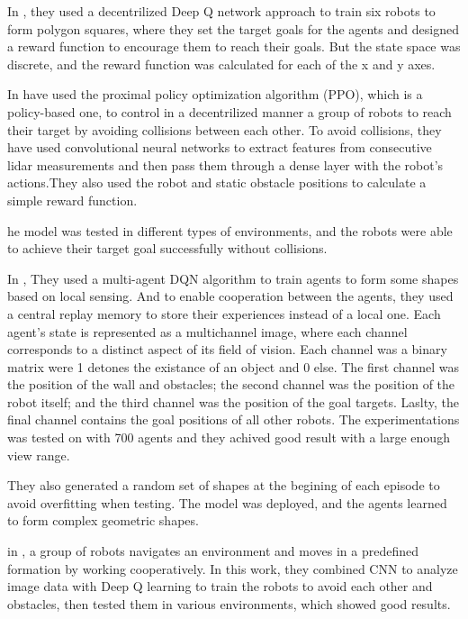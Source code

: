 \documentclass[12pt]{extarticle}
\begin{document}
In \cite{prasad2017multi}, they used a decentrilized Deep Q network approach to train six robots to form polygon squares, where they set the target goals for the agents and designed a reward function to encourage them to reach their goals. But the state space was discrete, and the reward function was calculated for each of the x and y axes.



In \cite{long2018towards} have used the proximal policy optimization algorithm (PPO), which is a policy-based one, to control in a decentrilized manner a group of robots to reach their target by avoiding collisions between each other. To avoid collisions, they have used convolutional neural networks to extract features from consecutive lidar measurements and then pass them through a dense layer with the robot's actions.They also used the robot and static obstacle positions to calculate a simple reward function.

 he model was tested in different types of environments, and the robots were able to achieve their target goal successfully without collisions.

In \cite{diallo2020multi}, They used a multi-agent DQN algorithm to train agents to form some shapes based on local sensing. And to enable cooperation between the agents, they used a central replay memory to store their experiences instead of a local one. Each agent's state is represented as a multichannel image, where each channel corresponds to a distinct aspect of its field of vision. Each channel was a binary matrix were 1 detones the existance of an object and 0 else. The first channel was the position of the wall and obstacles; the second channel was the position of the robot itself; and the third channel was the position of the goal targets. Laslty, the final channel contains the goal positions of all other robots.
The experimentations was tested on with  700 agents and they achived good result with a large enough view range.


They also generated a random  set of shapes at the begining of each episode to avoid overfitting when testing.
The model was deployed, and the agents learned to form complex geometric shapes.



in \cite{bae2019multi}, a group of robots navigates an environment and moves in a predefined formation by working cooperatively. In this work, they combined CNN to analyze image data with Deep Q learning to train the robots to avoid each other and obstacles, then tested them in various environments, which showed good results.
\end{document}
